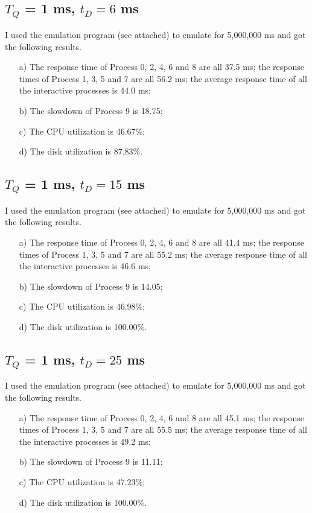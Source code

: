 \documentclass[12pt,letterpaper]{article}
\begin{document}
\subsection{$T_Q$ = 1 ms, $t_D=6$ ms}
I used the emulation program (see attached) to emulate for 5,000,000 ms and got the following results.
\begin{enumerate}
\item[a)] The response time of Process 0, 2, 4, 6 and 8 are all 37.5 ms; the response times of Process 1, 3, 5 and 7 are all 56.2 ms; the average response time of all the interactive processes is 44.0 ms;
\item[b)] The slowdown of Process 9 is 18.75;
\item[c)] The CPU utilization is 46.67\%;
\item[d)] The disk utilization is 87.83\%.
\end{enumerate}

\subsection{$T_Q$ = 1 ms, $t_D=15$ ms}
I used the emulation program (see attached) to emulate for 5,000,000 ms and got the following results.
\begin{enumerate}
\item[a)] The response time of Process 0, 2, 4, 6 and 8 are all 41.4 ms; the response times of Process 1, 3, 5 and 7 are all 55.2 ms; the average response time of all the interactive processes is 46.6 ms;
\item[b)] The slowdown of Process 9 is 14.05;
\item[c)] The CPU utilization is 46.98\%;
\item[d)] The disk utilization is 100.00\%.
\end{enumerate}

\subsection{$T_Q$ = 1 ms, $t_D=25$ ms}
I used the emulation program (see attached) to emulate for 5,000,000 ms and got the following results.
\begin{enumerate}
\item[a)] The response time of Process 0, 2, 4, 6 and 8 are all 45.1 ms; the response times of Process 1, 3, 5 and 7 are all 55.5 ms; the average response time of all the interactive processes is 49.2 ms;
\item[b)] The slowdown of Process 9 is 11.11;
\item[c)] The CPU utilization is 47.23\%;
\item[d)] The disk utilization is 100.00\%.
\end{enumerate}
\end{document}
